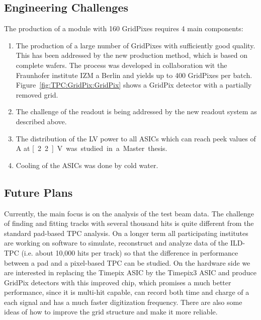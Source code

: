 \subsection{Engineering Challenges}
The production of a module with 160 GridPixes requires 4 main components:
\begin{enumerate}
	\item The production of a large number of GridPixes with sufficiently good quality. This has been addressed by the new production method, which is based on complete wafers. The process was developed in collaboration wit the Fraunhofer institute IZM a Berlin and yields up to 400 GridPixes per batch. Figure~\ref{fig:TPC:GridPix:GridPix} shows a GridPix detector with a partially removed grid.
	\item The challenge of the readout is being addressed by the new readout system as described above.
	\item The distribution of the LV power to all ASICs which can reach peek values of \unit[85]{A} at \unit[2.2]{V} was studied in a Master thesis.
	\item Cooling of the ASICs was done by cold water.
\end{enumerate}


\subsection{Future Plans}
Currently, the main focus is on the analysis of the test beam data. The challenge of finding and fitting tracks with several thousand hits is quite different from the standard pad-based TPC analysis. On a longer term all participating institutes are working on software to simulate, reconstruct and analyze data of the ILD-TPC (i.e. about 10,000 hits per track) so that the difference in performance between a pad and a pixel-based TPC can be studied.
On the hardware side we are interested in replacing the Timepix ASIC by the Timepix3 ASIC and produce GridPix detectors with this improved chip, which promises a much better performance, since it is multi-hit capable, can record both time and charge of a each signal and has a much faster digitization frequency. There are also some ideas of how to improve the grid structure and make it more reliable.

